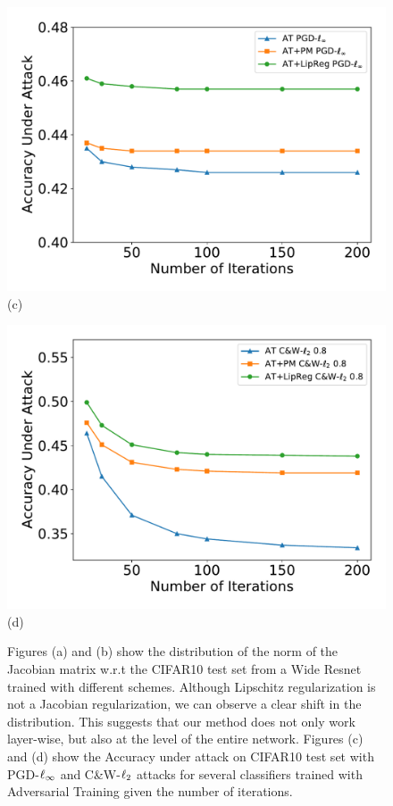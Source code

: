 \begin{figure}[htb]
\begin{minipage}{.24\linewidth}
    \includegraphics[scale=0.16]{figures/chapter4/attacks_iter_pgd.pdf}\\{(c)}
  \end{minipage}
  \hfill
  \begin{minipage}{.24\linewidth}
    \centering
    \includegraphics[scale=0.16]{figures/chapter4/attacks_iter_cw.pdf}\\{(d)}
  \end{minipage}
  \caption{Figures (a) and (b) show the distribution of the norm of the Jacobian matrix w.r.t the CIFAR10 test set from a Wide Resnet trained with different schemes. Although Lipschitz regularization is not a Jacobian regularization, we can observe a clear shift in the distribution. This suggests that our method does not only work layer-wise, but also at the level of the entire network. Figures (c) and (d) show the Accuracy under attack on CIFAR10 test set with PGD-$\ell_\infty$ and C\&W-$\ell_2$ attacks for several classifiers trained with Adversarial Training given the number of iterations.}
  \label{fig:dist_jacobian_attacks_iter}
\end{figure}%


